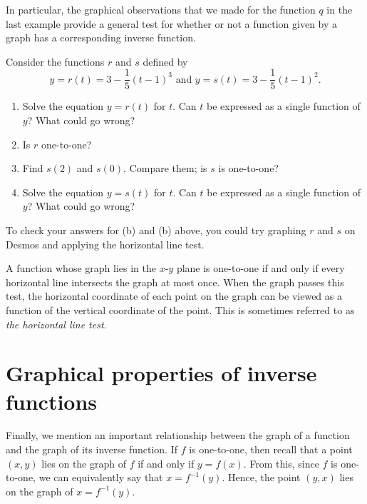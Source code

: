 \documentclass[nooutcomes]{ximera}
\begin{document}
In particular, the graphical observations that we made for the function $q$ in the last example provide a general test for whether or not a function given by a graph has a corresponding inverse function. 

\begin{exploration}
Consider the functions $r$ and $s$ defined by
$$
y = r(t) = 3 - \frac{1}{5}(t-1)^3 \text{ and } y = s(t) = 3 - \frac{1}{5}(t-1)^2.
$$


\begin{enumerate}[label=\alph*.]
\item Solve the equation $y = r(t)$ for $t$. Can $t$ be expressed as a single function of $y$? What could go wrong?
\item Is $r$ one-to-one?
\item Find $s(2)$ and $s(0)$. Compare them; is $s$ is one-to-one?
\item Solve the equation $y = s(t)$ for $t$. Can $t$ be expressed as a single function of $y$? What could go wrong?
\end{enumerate}
\end{exploration}

To check your answers for (b) and (b) above, you could try graphing $r$ and $s$ on Desmos and applying the horizontal line test. 
\begin{remark}
A function whose graph lies in the $x$-$y$ plane is one-to-one if and only if every horizontal line intersects the graph at most once.  When the graph passes this test, the horizontal coordinate of each point on the graph can be viewed as a function of the vertical coordinate of the point. This is sometimes referred to as \emph{the horizontal line test}.
\end{remark}



\section{Graphical properties of inverse functions}
Finally, we mention an important relationship between the graph of a function and the graph of its inverse function. If $f$ is one-to-one, then recall that a point $(x, y)$ lies on the graph of $f$ if and only if $y = f(x)$. From this, since $f$ is one-to-one, we can equivalently say that $x = f^{-1}(y)$.  Hence, the point $(y,x)$ lies on the graph of $x = f^{-1}(y)$.
\end{document}
